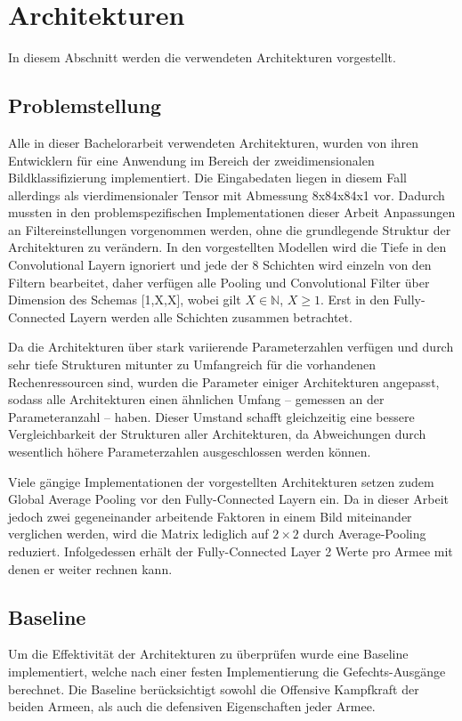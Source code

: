 \section{Architekturen}
\label{Archs}

In diesem Abschnitt werden die verwendeten Architekturen vorgestellt.

\subsection{Problemstellung}
Alle in dieser Bachelorarbeit verwendeten Architekturen, wurden von ihren Entwicklern für eine Anwendung im Bereich der zweidimensionalen Bildklassifizierung implementiert. Die Eingabedaten liegen in diesem Fall allerdings als vierdimensionaler Tensor mit Abmessung 8x84x84x1 vor. Dadurch mussten in den problemspezifischen Implementationen dieser Arbeit Anpassungen an Filtereinstellungen vorgenommen werden, ohne die grundlegende Struktur der Architekturen zu verändern. In den vorgestellten Modellen wird die Tiefe in den Convolutional Layern ignoriert und jede der 8 Schichten wird einzeln von den Filtern bearbeitet, daher verfügen alle Pooling und Convolutional Filter über Dimension des Schemas [1,X,X], wobei gilt $X \in \mathbb{N}$, $X \geq 1$. Erst in den Fully-Connected Layern werden alle Schichten zusammen betrachtet. 

Da die Architekturen über stark variierende Parameterzahlen verfügen und durch sehr tiefe Strukturen mitunter zu Umfangreich für die vorhandenen Rechenressourcen sind, wurden die Parameter einiger Architekturen angepasst, sodass alle Architekturen einen ähnlichen Umfang -- gemessen an der Parameteranzahl -- haben. Dieser Umstand schafft gleichzeitig eine bessere Vergleichbarkeit der Strukturen aller Architekturen, da Abweichungen durch wesentlich höhere Parameterzahlen ausgeschlossen werden können. 

Viele gängige Implementationen der vorgestellten Architekturen setzen zudem Global Average Pooling vor den Fully-Connected Layern ein. Da in dieser Arbeit jedoch zwei gegeneinander arbeitende Faktoren in einem Bild miteinander verglichen werden, wird die Matrix lediglich auf $2 \times 2$ durch Average-Pooling reduziert. Infolgedessen erhält der Fully-Connected Layer 2 Werte pro Armee mit denen er weiter rechnen kann. 
 
\subsection{Baseline}
Um die Effektivität der Architekturen zu überprüfen wurde eine Baseline implementiert, welche nach einer festen Implementierung die Gefechts-Ausgänge berechnet. Die Baseline berücksichtigt sowohl die Offensive Kampfkraft der beiden Armeen, als auch die defensiven Eigenschaften jeder Armee. 

